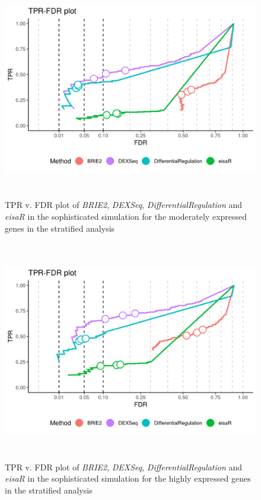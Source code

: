\begin{figure}[!htb]
\begin{center}
\includegraphics[width=6in,height=3.8in]{../figures/simulation/minnow_simulation_mod_FDR.png}
\end{center}
\caption{TPR v. FDR plot of \emph{BRIE2}, \emph{DEXSeq}, \emph{DifferentialRegulation} and \emph{eisaR} in the sophisticated simulation for the moderately expressed genes in the stratified analysis}
\label{fig:soph_sim_FDR_mod}
\end{figure}

\begin{figure}[!htb]
\begin{center}
\includegraphics[width=6in,height=3.8in]{../figures/simulation/minnow_simulation_high_FDR.png}
\end{center}
\caption{TPR v. FDR plot of \emph{BRIE2}, \emph{DEXSeq}, \emph{DifferentialRegulation} and \emph{eisaR} in the sophisticated simulation for the highly expressed genes in the stratified analysis}
\label{fig:soph_sim_FDR_high}
\end{figure}

